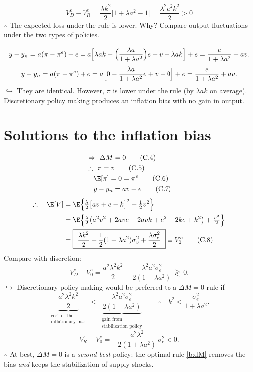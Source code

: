 \documentclass[11pt]{article}
\begin{document}
\begin{equation}
  V_D^e-V_R^e=\frac{\lambda k^2}{2}\bigl[1+\lambda a^2-1\bigr]
  =\frac{\lambda^2a^2k^2}{2}>0 \tag{B.11}\label{b:DR}
\end{equation}
$\therefore$ The expected loss under the rule is lower. Why? Compare output fluctuations
under the two types of policies.

\[
  y-y_n=a(\pi-\pi^e)+e
  =a\Bigl[\lambda ak-\Bigl(\frac{\lambda a}{1+\lambda a^2}\Bigr)e+v-\lambda ak\Bigr]+e
  =\frac{e}{1+\lambda a^2}+av .
\]
\[
  y-y_n=a(\pi-\pi^e)+e
  =a\Bigl[0-\frac{\lambda a}{1+\lambda a^2}e+v-0\Bigr]+e
  =\frac{e}{1+\lambda a^2}+av .
\]
$\hookrightarrow$ They are identical. However, $\pi$ is lower under the rule (by
$\lambda ak$ on average). Discretionary policy making produces an inflation bias with no
gain in output.


\section{Solutions to the inflation bias}

\begin{align}
  &\Rightarrow\ \Delta M=0 \tag{C.4}\label{c:dM}\\
  &\therefore\ \pi=v \tag{C.5}\label{c:pi}\\
  &\phantom{\therefore\ }\E[\pi]=0=\pi^e \tag{C.6}\label{c:Epi}\\
  &\phantom{\therefore\ }y-y_n=av+e \tag{C.7}\label{c:y}
\end{align}
\begin{align}
  \therefore\quad \E[V]&=\E\Bigl\{\tfrac{\lambda}{2}\bigl[av+e-k\bigr]^2+\tfrac12 v^2\Bigr\}
     \notag\\
   &=\E\Bigl\{\tfrac{\lambda}{2}\bigl(a^2v^2+2ave-2avk+e^2-2ke+k^2\bigr)
     +\tfrac{v^2}{2}\Bigr\}\notag\\
   &=\boxed{\ \frac{\lambda k^2}{2}+\frac12(1+\lambda a^2)\sigma_v^2
     +\frac{\lambda\sigma_e^2}{2}\ }\equiv V_0^e \tag{C.8}\label{c:V0}
\end{align}
Compare with discretion:
\[
  V_D^e-V_0^e=\frac{a^2\lambda^2k^2}{2}-\frac{\lambda^2a^2\sigma_e^2}{2(1+\lambda a^2)}
  \ \gtrless\ 0 .
\]
$\hookrightarrow$ Discretionary policy making would be preferred to a $\Delta M=0$ rule if
\[
  \underbrace{\frac{a^2\lambda^2k^2}{2}}_{\substack{\text{cost of the}\\
     \text{inflationary bias}}}
  \ <\
  \underbrace{\frac{\lambda^2a^2\sigma_e^2}{2(1+\lambda a^2)}}_{\substack{\text{gain from}\\
     \text{stabilization policy}}}
  \qquad\therefore\quad k^2<\frac{\sigma_e^2}{1+\lambda a^2}.
\]
\[
  V_R^e-V_0^e=-\frac{a^2\lambda^2}{2(1+\lambda a^2)}\,\sigma_e^2<0 .
\]
$\therefore$ At best, $\Delta M=0$ is a \emph{second-best} policy: the optimal rule
\eqref{b:dM} removes the bias \emph{and} keeps the stabilization of supply shocks.
\end{document}
